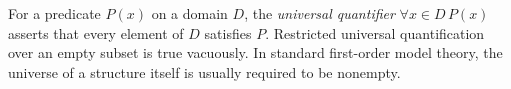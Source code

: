 
For a predicate $P(x)$ on a domain $D$, the \emph{universal quantifier} $\forall x\in D\,P(x)$ asserts that every element of $D$ satisfies $P$. Restricted universal quantification over an empty subset is true vacuously. In standard first-order model theory, the universe of a structure itself is usually required to be nonempty.

